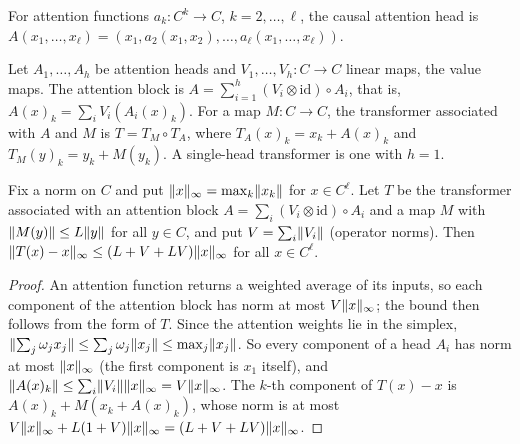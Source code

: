 \begin{definition}
\label{def:head}
\leanok
{}
For attention functions $a_k\colon C^k\to C$, $k=2,\ldots,\ell$, the causal
attention head is
$A(x_1,\ldots,x_\ell)=(x_1,a_2(x_1,x_2),\ldots,a_\ell(x_1,\ldots,x_\ell))$.
\end{definition}

\begin{definition}[Transformer]
\label{def:transformer}
\leanok
{}
Let $A_1,\ldots,A_h$ be attention heads and $V_1,\ldots,V_h\colon C\to C$
linear maps, the value maps. The attention block is
$A=\sum_{i=1}^h(V_i\otimes\mathrm{id})\circ A_i$, that is,
$A(x)_k=\sum_iV_i(A_i(x)_k)$. For a map $M\colon C\to C$, the transformer
associated with $A$ and $M$ is $T=T_M\circ T_A$, where
$T_A(x)_k=x_k+A(x)_k$ and $T_M(y)_k=y_k+M(y_k)$. A single-head
transformer is one with $h=1$.
\end{definition}

\begin{proposition}
\label{prop:near-identity}
\leanok
{}
Fix a norm on $C$ and put $\lVert x\rVert_\infty=\max_k\lVert x_k\rVert$ for
$x\in C^\ell$. Let $T$ be the transformer associated with an attention
block $A=\sum_i(V_i\otimes\mathrm{id})\circ A_i$ and a map $M$ with
$\lVert M(y)\rVert\le L\lVert y\rVert$ for all $y\in C$, and put $V=\sum_i\lVert V_i\rVert$
(operator norms). Then $\lVert T(x)-x\rVert_\infty\le(L+V+LV)\lVert x\rVert_\infty$
for all $x\in C^\ell$.
\end{proposition}
\begin{proof}
\leanok
{}
An attention function returns a weighted average of its inputs, so each
component of the attention block has norm at most $V\lVert x\rVert_\infty$; the
bound then follows from the form of $T$. Since the attention weights lie in the simplex,
$\lVert \sum_j\omega_jx_j\rVert\le\sum_j\omega_j\lVert x_j\rVert\le\max_j\lVert x_j\rVert$.
So every component of a head $A_i$ has norm at most $\lVert x\rVert_\infty$
(the first component is $x_1$ itself), and
$\lVert A(x)_k\rVert\le\sum_i\lVert V_i\rVert\lVert x\rVert_\infty=V\lVert x\rVert_\infty$. The
$k$-th component of $T(x)-x$ is $A(x)_k+M(x_k+A(x)_k)$, whose norm is at
most $V\lVert x\rVert_\infty+L(1+V)\lVert x\rVert_\infty=(L+V+LV)\lVert x\rVert_\infty$.
\end{proof}


